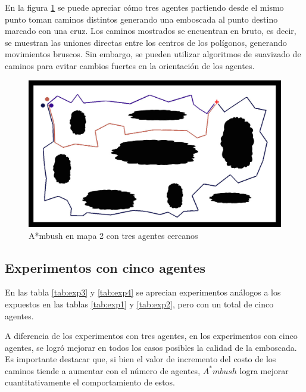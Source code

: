 \documentclass{egpubl}
\begin{document}
En la figura \ref{fig:ambush1} se puede apreciar
cómo tres agentes partiendo desde el mismo punto
toman caminos distintos generando una emboscada
al punto destino marcado con una cruz. Los caminos
mostrados se encuentran en bruto, es decir, se
muestran las uniones directas entre los centros
de los polígonos, generando movimientos bruscos.
Sin embargo, se pueden utilizar algoritmos de
suavizado de caminos \cite{MF09} para evitar cambios fuertes
en la orientación de los agentes.

\begin{figure}[htb]
	\begin{center}
		\includegraphics[scale=0.17]{ambush.jpg}
	\end{center}
	\caption{\label{fig:ambush1}
	     A*mbush en mapa 2 con tres agentes cercanos}
\end{figure}

\subsection{Experimentos con cinco agentes}
\label{sec:5agentes}





En las tabla \ref{tab:exp3} y \ref{tab:exp4} se 
aprecian experimentos análogos a los expuestos en
las tablas \ref{tab:exp1} y \ref{tab:exp2}, pero
con un total de cinco agentes.

A diferencia de los experimentos con tres agentes,
en los experimentos con cinco agentes, se logró
mejorar en todos los casos posibles la calidad de
la emboscada. Es importante destacar que, si
bien el valor de incremento del costo de los caminos
tiende a aumentar con el número de agentes, $A^*mbush$
logra mejorar cuantitativamente el comportamiento de estos.
\end{document}
